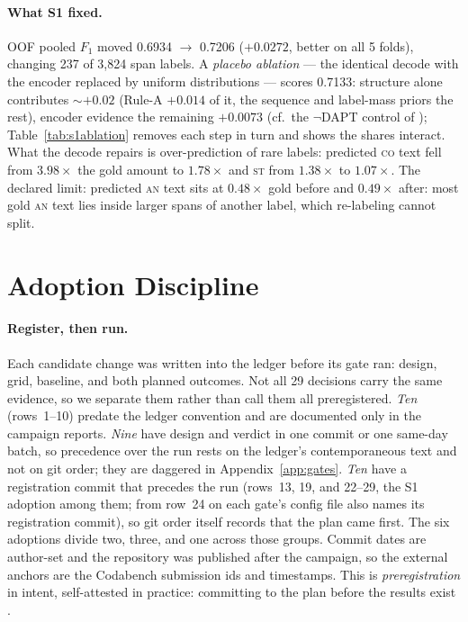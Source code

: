 \documentclass[11pt]{article}
\newcommand{\lab}[1]{\textsc{#1}}
\newcommand{\co}{\lab{co}}
\newcommand{\st}{\lab{st}}
\newcommand{\an}{\lab{an}}
\begin{document}
\paragraph{What S1 fixed.} OOF pooled $F_1$ moved 0.6934 $\rightarrow$
0.7206 ($+0.0272$, better on all 5 folds), changing 237 of 3{,}824 span
labels. A \emph{placebo ablation} --- the identical decode with the
encoder replaced by uniform distributions --- scores 0.7133: structure
alone contributes $\sim$$+0.02$ (Rule-A $+0.014$ of it, the sequence
and label-mass priors the rest), encoder evidence the remaining $+0.0073$ (cf.\ the
$\neg$DAPT control of \citealp{gururangan-etal-2020-dont});
Table~\ref{tab:s1ablation} removes each step in turn and shows the
shares interact. What the decode repairs is
over-prediction of rare labels: predicted \co{} text fell from
$3.98\times$ the gold amount to $1.78\times$ and \st{} from $1.38\times$
to $1.07\times$. The declared limit: predicted \an{} text sits at
$0.48\times$ gold before and $0.49\times$ after: most gold \an{} text lies
inside larger spans of another label, which re-labeling cannot split.

\section{Adoption Discipline}
\label{sec:method}

\paragraph{Register, then run.} Each candidate change was written
into the ledger before its gate ran: design, grid, baseline, and both
planned outcomes. Not all 29 decisions carry the same evidence, so we
separate them rather than call them all preregistered. \emph{Ten}
(rows~1--10) predate the ledger convention and are documented only in
the campaign reports. \emph{Nine} have design and verdict in one commit
or one same-day batch, so precedence over the run rests on the ledger's
contemporaneous text and not on git order; they are daggered in
Appendix~\ref{app:gates}. \emph{Ten} have a registration commit that
precedes the run (rows~13, 19, and 22--29, the S1 adoption among them;
from row~24 on each gate's config file also names its registration
commit), so git order itself records that the plan came first. The six
adoptions divide two, three, and one across those groups. Commit dates
are author-set and the repository was published after the campaign, so
the external anchors are the Codabench submission ids and timestamps.
This is \emph{preregistration} in intent, self-attested in practice:
committing to the plan before the results exist
\citep{vanmiltenburg-etal-2021-preregistering}.
\end{document}
